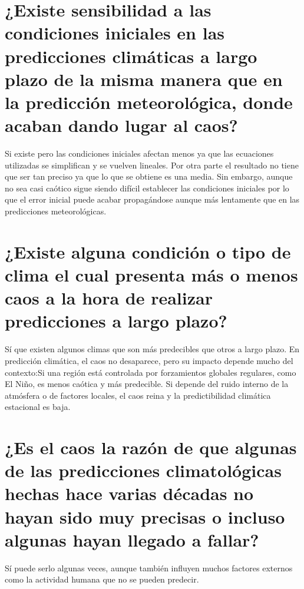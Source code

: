\documentclass[
  10pt,
  a4paper,
  DIV=11,
  numbers=noendperiod,
  open=any]{scrreprt}
\numberwithin{equation}{chapter}
\numberwithin{equation}{section}
\renewcommand{\[}{\begin{equation}}
\renewcommand{\]}{\end{equation}}
\begin{document}
\section{¿Existe sensibilidad a las condiciones iniciales en las
predicciones climáticas a largo plazo de la misma manera que en la
predicción meteorológica, donde acaban dando lugar al
caos?}\label{existe-sensibilidad-a-las-condiciones-iniciales-en-las-predicciones-climuxe1ticas-a-largo-plazo-de-la-misma-manera-que-en-la-predicciuxf3n-meteoroluxf3gica-donde-acaban-dando-lugar-al-caos}

Si existe pero las condiciones iniciales afectan menos ya que las
ecuaciones utilizadas se simplifican y se vuelven lineales. Por otra
parte el resultado no tiene que ser tan preciso ya que lo que se obtiene
es una media. Sin embargo, aunque no sea casi caótico sigue siendo
difícil establecer las condiciones iniciales por lo que el error inicial
puede acabar propagándose aunque más lentamente que en las predicciones
meteorológicas.

\section{¿Existe alguna condición o tipo de clima el cual presenta más o
menos caos a la hora de realizar predicciones a largo
plazo?}\label{existe-alguna-condiciuxf3n-o-tipo-de-clima-el-cual-presenta-muxe1s-o-menos-caos-a-la-hora-de-realizar-predicciones-a-largo-plazo}

Sí que existen algunos climas que son más predecibles que otros a largo
plazo. En predicción climática, el caos no desaparece, pero su impacto
depende mucho del contexto:Si una región está controlada por
forzamientos globales regulares, como El Niño, es menos caótica y más
predecible. Si depende del ruido interno de la atmósfera o de factores
locales, el caos reina y la predictibilidad climática estacional es
baja.

\section{¿Es el caos la razón de que algunas de las predicciones
climatológicas hechas hace varias décadas no hayan sido muy precisas o
incluso algunas hayan llegado a
fallar?}\label{es-el-caos-la-razuxf3n-de-que-algunas-de-las-predicciones-climatoluxf3gicas-hechas-hace-varias-duxe9cadas-no-hayan-sido-muy-precisas-o-incluso-algunas-hayan-llegado-a-fallar}

Sí puede serlo algunas veces, aunque también influyen muchos factores
externos como la actividad humana que no se pueden predecir.
\end{document}
